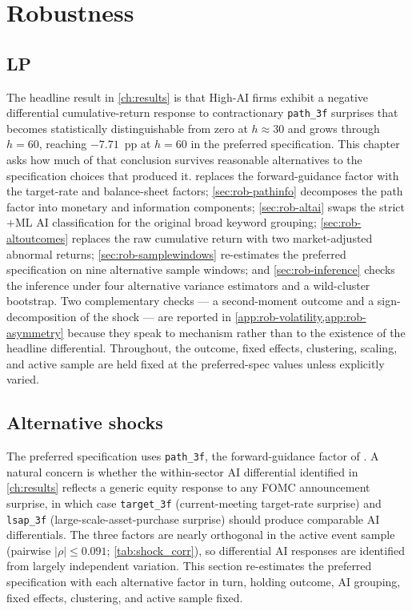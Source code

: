 \chapter{Robustness}
\label{ch:robustness}

\section{LP}

The headline result in \cref{ch:results} is that High-AI firms exhibit
a negative differential cumulative-return response to contractionary
\texttt{path\_3f} surprises that becomes statistically distinguishable
from zero at $h \approx 30$ and grows through $h = 60$, reaching
$-7.71$~pp at $h = 60$ in the preferred specification. This chapter
asks how much of that conclusion survives reasonable alternatives to
the specification choices that produced it. 
replaces the forward-guidance factor with the target-rate and
balance-sheet factors; \cref{sec:rob-pathinfo} decomposes the path
factor into monetary and information components;
\cref{sec:rob-altai} swaps the strict$+$ML AI classification for the
original broad keyword grouping; \cref{sec:rob-altoutcomes} replaces
the raw cumulative return with two market-adjusted abnormal returns;
\cref{sec:rob-samplewindows} re-estimates the preferred specification
on nine alternative sample windows; and \cref{sec:rob-inference}
checks the inference under four alternative variance estimators and
a wild-cluster bootstrap. Two complementary checks --- a
second-moment outcome and a sign-decomposition of the shock --- are
reported in \cref{app:rob-volatility,app:rob-asymmetry} because they
speak to mechanism rather than to the existence of the headline
differential. Throughout, the outcome, fixed effects, clustering,
scaling, and active sample are held fixed at the preferred-spec
values unless explicitly varied.

\section{Alternative shocks}
\label{sec:rob-altshocks}

The preferred specification uses \texttt{path\_3f}, the
forward-guidance factor of \citet{swanson2021}. A natural concern is
whether the within-sector AI differential identified in
\cref{ch:results} reflects a generic equity response to any FOMC
announcement surprise, in which case \texttt{target\_3f}
(current-meeting target-rate surprise) and \texttt{lsap\_3f}
(large-scale-asset-purchase surprise) should produce comparable AI
differentials. The three factors are nearly orthogonal in the active
event sample (pairwise $|\rho| \leq 0.091$; \cref{tab:shock_corr}),
so differential AI responses are identified from largely independent
variation. This section re-estimates the preferred specification with
each alternative factor in turn, holding outcome, AI grouping, fixed
effects, clustering, and active sample fixed.

